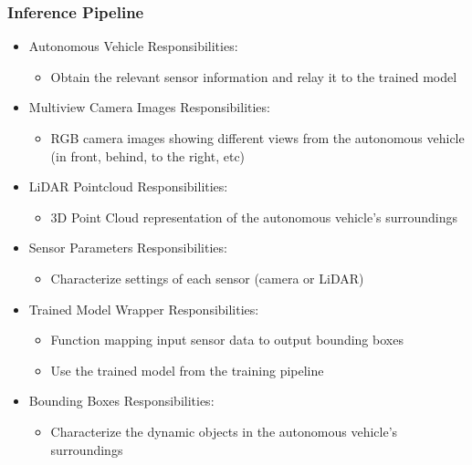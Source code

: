 \documentclass[12pt]{article}
\begin{document}
\subsubsection{Inference Pipeline}

\begin{itemize}
\item Autonomous Vehicle Responsibilities:
\begin{itemize}
\item Obtain the relevant sensor information and relay it to the trained model
\end{itemize}
\item Multiview Camera Images Responsibilities:
\begin{itemize}
\item RGB camera images showing different views from the autonomous vehicle (in front, behind, to the right, etc) 
\end{itemize}
\item LiDAR Pointcloud Responsibilities:
\begin{itemize}
\item 3D Point Cloud representation of the autonomous vehicle's surroundings
\end{itemize}
\item Sensor Parameters Responsibilities:
\begin{itemize}
\item Characterize settings of each sensor (camera or LiDAR)
\end{itemize}
\item Trained Model Wrapper Responsibilities:
\begin{itemize}
\item Function mapping input sensor data to output bounding boxes
\item Use the trained model from the training pipeline
\end{itemize}
\item Bounding Boxes Responsibilities:
\begin{itemize}
\item Characterize the dynamic objects in the autonomous vehicle's surroundings
\end{itemize}
\end{itemize}
\end{document}
